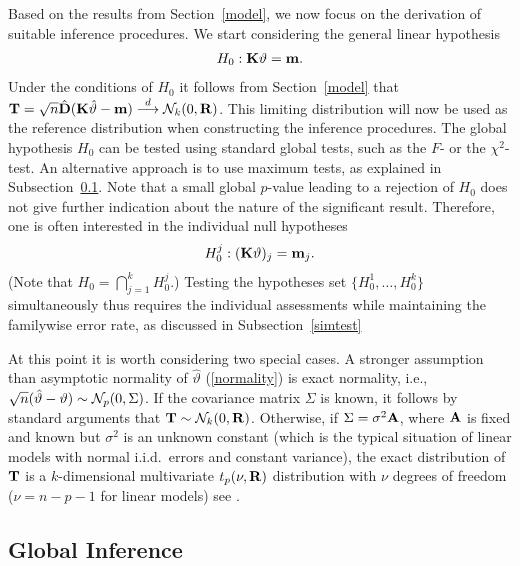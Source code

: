 \documentclass[12pt]{article}
\begin{document}
Based on the results from Section~\ref{model}, we now focus on the derivation
of suitable inference procedures. We start considering the general linear 
hypothesis \citep{Searle1971}
\begin{eqnarray*}
H_0: \mathbf{K} \vartheta = \mathbf{m}.
\end{eqnarray*}
Under the conditions of $H_0$ it follows from Section~\ref{model} that
$\mathbf{T} = \sqrt{n} \hat{\mathbf{D}} (\mathbf{K} \hat{\vartheta} - \mathbf{m}) \stackrel{d}{\longrightarrow} \mathcal{N}_k(0, \mathbf{R})$. 
This limiting distribution
will now be used as the reference distribution when constructing the
inference procedures.
The global hypothesis $H_0$ can be tested using standard global tests, such as
the $F$- or the $\chi^2$-test. An alternative approach is to use maximum tests, as explained
in Subsection~\ref{global}. Note that a small global $p$-value
leading to a rejection of $H_0$ does not give further indication about the nature of the
significant result. Therefore, one is often interested in the individual null hypotheses
\begin{eqnarray*}
H_0^j: (\mathbf{K}\vartheta)_j = \mathbf{m}_j.
\end{eqnarray*}
(Note that $H_0 = \bigcap_{j = 1}^k H_0^j$.) Testing the hypotheses set
$\{H_0^1, \ldots, H_0^k\}$ simultaneously thus requires the individual 
assessments while maintaining the
familywise error rate, as discussed in Subsection~\ref{simtest}

At this point it is worth
considering two special cases. A stronger assumption than asymptotic normality
of $\hat{\vartheta}$ (\ref{normality}) is exact normality, i.e.,
$\sqrt{n} (\hat{\vartheta} - \vartheta) \sim \mathcal{N}_p(0, \Sigma)$. 
If the covariance matrix $\Sigma$ is known, it
follows by standard arguments that $\mathbf{T} \sim \mathcal{N}_k(0, \mathbf{R})$.
Otherwise, if $\Sigma = \sigma^2 \mathbf{A}$, where $\mathbf{A}$ is fixed and known
but $\sigma^2$ is an unknown constant (which is the typical situation of linear models
with normal i.i.d.~errors and constant variance), the
exact distribution of $\mathbf{T}$ is a $k$-dimensional multivariate
$t_p(\nu, \mathbf{R})$
distribution with $\nu$ degrees of freedom ($\nu = n - p - 1$ for linear models) 
see \citep{Tong1990}.


\subsection{Global Inference} \label{global}
\end{document}
